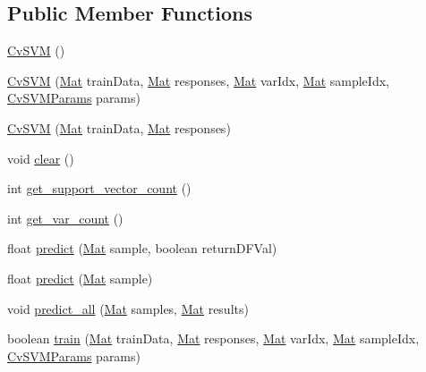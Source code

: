 \subsection*{Public Member Functions}
\begin{DoxyCompactItemize}
\item 
\mbox{\hyperlink{classorg_1_1opencv_1_1ml_1_1_cv_s_v_m_ac99a9f7445996e98af48b55d396541d7}{Cv\+S\+VM}} ()
\item 
\mbox{\hyperlink{classorg_1_1opencv_1_1ml_1_1_cv_s_v_m_a5ffb88bb8e1bbb45de899f51b69d943e}{Cv\+S\+VM}} (\mbox{\hyperlink{classorg_1_1opencv_1_1core_1_1_mat}{Mat}} train\+Data, \mbox{\hyperlink{classorg_1_1opencv_1_1core_1_1_mat}{Mat}} responses, \mbox{\hyperlink{classorg_1_1opencv_1_1core_1_1_mat}{Mat}} var\+Idx, \mbox{\hyperlink{classorg_1_1opencv_1_1core_1_1_mat}{Mat}} sample\+Idx, \mbox{\hyperlink{classorg_1_1opencv_1_1ml_1_1_cv_s_v_m_params}{Cv\+S\+V\+M\+Params}} params)
\item 
\mbox{\hyperlink{classorg_1_1opencv_1_1ml_1_1_cv_s_v_m_a29ca272a49cf40fb9de4d37a3998dba6}{Cv\+S\+VM}} (\mbox{\hyperlink{classorg_1_1opencv_1_1core_1_1_mat}{Mat}} train\+Data, \mbox{\hyperlink{classorg_1_1opencv_1_1core_1_1_mat}{Mat}} responses)
\item 
void \mbox{\hyperlink{classorg_1_1opencv_1_1ml_1_1_cv_s_v_m_a3c8c9c491cecb7d41b0ac0de636803ef}{clear}} ()
\item 
int \mbox{\hyperlink{classorg_1_1opencv_1_1ml_1_1_cv_s_v_m_ac09d3273950c722f14668c7e227fb70e}{get\+\_\+support\+\_\+vector\+\_\+count}} ()
\item 
int \mbox{\hyperlink{classorg_1_1opencv_1_1ml_1_1_cv_s_v_m_ae746960801621738e3148cb67c0835f3}{get\+\_\+var\+\_\+count}} ()
\item 
float \mbox{\hyperlink{classorg_1_1opencv_1_1ml_1_1_cv_s_v_m_ae6f65370c9fee5f2959d9737d40aadd9}{predict}} (\mbox{\hyperlink{classorg_1_1opencv_1_1core_1_1_mat}{Mat}} sample, boolean return\+D\+F\+Val)
\item 
float \mbox{\hyperlink{classorg_1_1opencv_1_1ml_1_1_cv_s_v_m_a92ce14aadb47b185792052fe7075a260}{predict}} (\mbox{\hyperlink{classorg_1_1opencv_1_1core_1_1_mat}{Mat}} sample)
\item 
void \mbox{\hyperlink{classorg_1_1opencv_1_1ml_1_1_cv_s_v_m_a17f89e26cf9aba5794fd55d20348a453}{predict\+\_\+all}} (\mbox{\hyperlink{classorg_1_1opencv_1_1core_1_1_mat}{Mat}} samples, \mbox{\hyperlink{classorg_1_1opencv_1_1core_1_1_mat}{Mat}} results)
\item 
boolean \mbox{\hyperlink{classorg_1_1opencv_1_1ml_1_1_cv_s_v_m_af61821e7066a0d6fed7a24c858ec61a8}{train}} (\mbox{\hyperlink{classorg_1_1opencv_1_1core_1_1_mat}{Mat}} train\+Data, \mbox{\hyperlink{classorg_1_1opencv_1_1core_1_1_mat}{Mat}} responses, \mbox{\hyperlink{classorg_1_1opencv_1_1core_1_1_mat}{Mat}} var\+Idx, \mbox{\hyperlink{classorg_1_1opencv_1_1core_1_1_mat}{Mat}} sample\+Idx, \mbox{\hyperlink{classorg_1_1opencv_1_1ml_1_1_cv_s_v_m_params}{Cv\+S\+V\+M\+Params}} params)

\end{DoxyCompactItemize}

